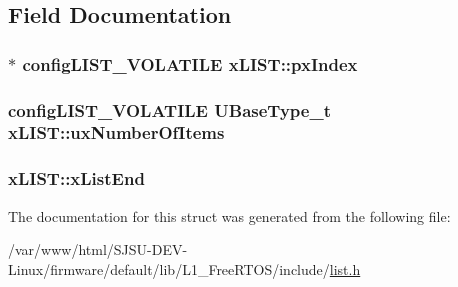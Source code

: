 \subsection{Field Documentation}
\subsubsection[{\texorpdfstring{px\+Index}{pxIndex}}]{$\ast$ {\bf config\+L\+I\+S\+T\+\_\+\+V\+O\+L\+A\+T\+I\+LE} x\+L\+I\+S\+T\+::px\+Index}\hypertarget{structxLIST_a7bf64d87701493b4c8c5c977682500d7}{}\label{structxLIST_a7bf64d87701493b4c8c5c977682500d7}
\subsubsection[{\texorpdfstring{ux\+Number\+Of\+Items}{uxNumberOfItems}}]{ {\bf config\+L\+I\+S\+T\+\_\+\+V\+O\+L\+A\+T\+I\+LE} {\bf U\+Base\+Type\+\_\+t} x\+L\+I\+S\+T\+::ux\+Number\+Of\+Items}\hypertarget{structxLIST_aa5cb7cdc699e1252af0441e46e427a03}{}\label{structxLIST_aa5cb7cdc699e1252af0441e46e427a03}
\subsubsection[{\texorpdfstring{x\+List\+End}{xListEnd}}]{ x\+L\+I\+S\+T\+::x\+List\+End}\hypertarget{structxLIST_a49ad62fa153126e27e273811167b336a}{}\label{structxLIST_a49ad62fa153126e27e273811167b336a}


The documentation for this struct was generated from the following file\+:\begin{DoxyCompactItemize}
\item 
/var/www/html/\+S\+J\+S\+U-\/\+D\+E\+V-\/\+Linux/firmware/default/lib/\+L1\+\_\+\+Free\+R\+T\+O\+S/include/\hyperlink{list_8h}{list.\+h}\end{DoxyCompactItemize}
